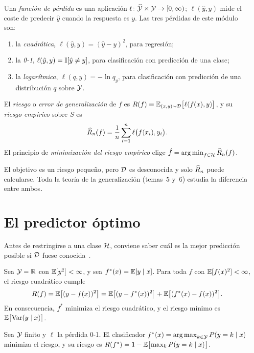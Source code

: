 \begin{definicion}\label{def:riesgo}
Una \emph{función de pérdida} es una aplicación $\ell\colon\widehat{\mathcal{Y}}\times\mathcal{Y}\to[0,\infty)$; $\ell(\hat y,y)$ mide el coste de predecir $\hat y$ cuando la respuesta es $y$. Las tres pérdidas de este módulo son:
\begin{enumerate}
  \item la \emph{cuadrática}, $\ell(\hat y,y)=(\hat y-y)^{2}$, para regresión;
  \item la \emph{0-1}, $\ell(\hat y,y)=\mathbb{I}[\hat y\ne y]$, para clasificación con predicción de una clase;
  \item la \emph{logarítmica}, $\ell(q,y)=-\ln q_y$, para clasificación con predicción de una distribución $q$ sobre $\mathcal{Y}$.
\end{enumerate}
El \emph{riesgo} o \emph{error de generalización} de $f$ es $R(f)=\mathbb{E}_{(x,y)\sim\mathcal{D}}\bigl[\ell(f(x),y)\bigr]$, y su \emph{riesgo empírico} sobre $S$ es
\[
\widehat{R}_n(f)=\frac{1}{n}\sum_{i=1}^{n}\ell\bigl(f(x_i),y_i\bigr).
\]
El principio de \emph{minimización del riesgo empírico} elige $\hat f=\operatorname*{arg\,min}_{f\in\mathcal{H}}\widehat{R}_n(f)$.
\end{definicion}

El objetivo es un riesgo pequeño, pero $\mathcal{D}$ es desconocida y solo $\widehat{R}_n$ puede calcularse. Toda la teoría de la generalización (temas~5 y~6) estudia la diferencia entre ambos.

\section{El predictor óptimo}

Antes de restringirse a una clase $\mathcal{H}$, conviene saber cuál es la mejor predicción posible si $\mathcal{D}$ fuese conocida~\cite[§2.4]{esl}.

\begin{teorema}\label{teo:regresion}
Sea $\mathcal{Y}=\mathbb{R}$ con $\mathbb{E}[y^{2}]<\infty$, y sea $f^{*}(x)=\mathbb{E}[y\mid x]$. Para toda $f$ con $\mathbb{E}[f(x)^{2}]<\infty$, el riesgo cuadrático cumple
\[
R(f)=\mathbb{E}\bigl[(y-f(x))^{2}\bigr]=\mathbb{E}\bigl[(y-f^{*}(x))^{2}\bigr]+\mathbb{E}\bigl[(f^{*}(x)-f(x))^{2}\bigr].
\]
En consecuencia, $f^{*}$ minimiza el riesgo cuadrático, y el riesgo mínimo es $\mathbb{E}\bigl[\operatorname{Var}(y\mid x)\bigr]$.
\end{teorema}

\begin{proposicion}\label{prop:bayes}
Sea $\mathcal{Y}$ finito y $\ell$ la pérdida 0-1. El clasificador $f^{*}(x)=\operatorname*{arg\,max}_{k\in\mathcal{Y}}P(y=k\mid x)$ minimiza el riesgo, y su riesgo es $R(f^{*})=1-\mathbb{E}\bigl[\max_k P(y=k\mid x)\bigr]$.
\end{proposicion}

